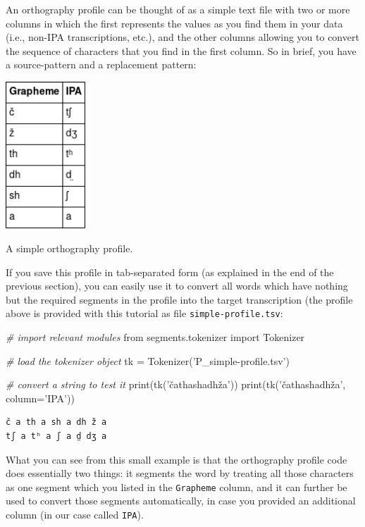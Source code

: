 \documentclass[a4paper,svgnames]{scrartcl}
\newenvironment{Shaded}{}{}
\newcommand{\StringTok}[1]{\textcolor[rgb]{0.25,0.44,0.63}{#1}}
\newcommand{\ImportTok}[1]{#1}
\newcommand{\CommentTok}[1]{\textcolor[rgb]{0.38,0.63,0.69}{\textit{#1}}}
\newcommand{\OperatorTok}[1]{\textcolor[rgb]{0.40,0.40,0.40}{#1}}
\newcommand{\BuiltInTok}[1]{#1}
\newcommand{\NormalTok}[1]{#1}
\begin{document}
An orthography profile can be thought of as a simple text file with two
or more columns in which the first represents the values as you find
them in your data (i.e., non-IPA transcriptions, etc.), and the other
columns allowing you to convert the sequence of characters that you find
in the first column. So in brief, you have a source-pattern and a
replacement pattern:

\begin{table}
\centering
\includegraphics[width=3cm]{images/table-9.png}
\caption{A simple orthography profile.}
\end{table}

If you save this profile in tab-separated form (as explained in the end
of the previous section), you can easily use it to convert all words
which have nothing but the required segments in the profile into the
target transcription (the profile above is provided with this tutorial
as file \texttt{simple-profile.tsv}:

\begin{Shaded}
\begin{Highlighting}[]
\CommentTok{# import relevant modules}
\ImportTok{from}\NormalTok{ segments.tokenizer }\ImportTok{import}\NormalTok{ Tokenizer}

\CommentTok{# load the tokenizer object}
\NormalTok{tk }\OperatorTok{=}\NormalTok{ Tokenizer(}\StringTok{'P_simple-profile.tsv'}\NormalTok{)}

\CommentTok{# convert a string to test it}
\BuiltInTok{print}\NormalTok{(tk(}\StringTok{'čathashadhža'))}
\StringTok{print(tk('}\NormalTok{čathashadhža}\StringTok{', column='}\NormalTok{IPA}\StringTok{'))}
\end{Highlighting}
\end{Shaded}

\begin{verbatim}
č a th a sh a dh ž a
tʃ a tʰ a ʃ a d̤ dʒ a
\end{verbatim}

What you can see from this small example is that the orthography profile
code does essentially two things: it segments the word by treating all
those characters as one segment which you listed in the
\texttt{Grapheme} column, and it can further be used to convert those
segments automatically, in case you provided an additional column (in
our case called \texttt{IPA}).
\end{document}
